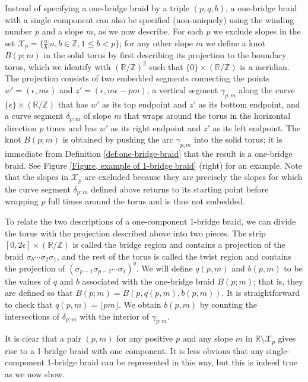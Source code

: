 \documentclass{amsart}
\newcommand{\Z}{\mathbb{Z}}
\newcommand{\R}{\mathbb{R}}
\theoremstyle{definition}
\theoremstyle{remark}
\numberwithin{equation}{section}
\numberwithin{equation}{section} \makeatletter
\begin{document}
Instead of specifying a one-bridge braid by a triple $(p,q,b)$, a one-bridge braid with a single component can also be specified (non-uniquely) using the winding number $p$ and a slope $m$, as we now describe. For each $p$ we exclude slopes in the set $\mathcal{X}_p = \{\frac a b | a,b \in \Z, 1\le b < p\}$; for any other slope $m$ we define a knot $B(p; m)$ in the solid torus by first describing its projection to the boundary torus, which we identify with $(\R/\Z)^2$ such that $\{0\}\times(\R/\Z)$ is a meridian. The projection consists of two embedded segments connecting the points $w' = (\epsilon, m\epsilon)$ and $z' = (\epsilon, m\epsilon - pm)$, a vertical segment $\gamma_{p;m}$ along the curve $\{\epsilon\}\times(\R/\Z)$ that has $w'$ as its top endpoint and $z'$ as its bottom endpoint, and a curve segment $\delta_{p;m}$ of slope $m$ that wraps around the torus in the horizontal direction $p$ times and has $w'$ as its right endpoint and $z'$ as its left endpoint. The knot $B(p; m)$ is obtained by pushing the arc $\gamma_{p;m}$ into the solid torus; it is immediate from Definition \ref{def:one-bridge-braid} that the result is a one-bridge braid. See Figure \ref{Figure, example of 1-bridge braid} (right) for an example. Note that the slopes in $\mathcal{X}_p$ are excluded because they are precisely the slopes for which the curve segment $\delta_{p;m}$ defined above returns to its starting point before wrapping $p$ full times around the torus and is thus not embedded.

To relate the two descriptions of a one-component 1-bridge braid, we can divide the torus with the projection described above into two pieces. The strip $[0,2\epsilon]\times (\R/\Z)$ is called the bridge region and contains a projection of the braid $\sigma_b \cdots \sigma_2 \sigma_1$, and the rest of the torus is called the twist region and contains the projection of $(\sigma_{p-1} \sigma_{p-2} \cdots \sigma_1)^q$. We will define $q(p,m)$ and $b(p,m)$ to be the values of $q$ and $b$ associated with the one-bridge braid $B(p; m)$; that is, they are defined so that $B(p; m) = B(p, q(p,m), b(p,m))$. It is straightforward to check that $q(p,m) = \lfloor pm \rfloor$. We obtain $b(p,m)$ by counting the intersections of $\delta_{p;m}$ with the interior of $\gamma_{p;m}$. 

It is clear that a pair $(p,m)$ for any positive $p$ and any slope $m$ in $\R \setminus \mathcal{X}_p$ gives rise to a 1-bridge braid with one component. It is less obvious that any single-component 1-bridge braid can be represented in this way, but this is indeed true as we now show.
\end{document}
